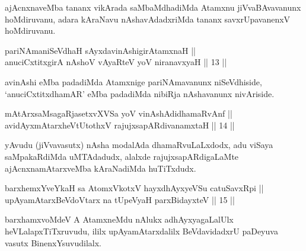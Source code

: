 \begin{artha}
ajAcnxnaveMba tananx vikArada saMbaMdhadiMda Atamxnu jiVvaBAvavanunx hoMdiruvanu, adara kAraNavu nAshavAdadxriMda tananx savxrUpavanenxV hoMdiruvanu.
\end{artha}


\begin{shl}
pariNAmaniSeVdhaH sAyxdavinAshigirA\s \s tamxnaH || \\
anuciCxtitxgirA nAshoV vAyaRteV yoV niranavxyaH \hfill || 13 ||  
\end{shl}	

\begin{artha}
avinAshi eMba padadiMda Atamxnige pariNAmavanunx niSeVdhiside, `anuciCxtitxdhamAR' eMba padadiMda nibiRja nAshavanunx nivAriside.
\end{artha}


\begin{shl}
mAtArxsaMsagaRjasetxvXVSa yoV vinAshAdidhamaRvAnf ||  \\
avidAyxmAtarxheVtUtothxV rajujxsapARdivanamxtaH \hfill || 14 ||  
\end{shl}

\begin{artha}
yAvudu (jiVvavasutx) nAsha modalAda dhamaRvuLaLxdodx, adu viSaya saMpakaRdiMda uMTAdadudx, alalxde rajujxsapARdigaLaMte ajAcnxnamAtarxveMba kAraNadiMda huTiTxdudx.
\end{artha}


\begin{shl}
barxhemxYveYkaH sa AtomxVkotxV hayxdhAyxyeVSu catuSavxRpi || \\
upAyamAtarxBeVdoV\s tarx na tUpeVyaH parxBidayxteV \hfill || 15 ||  
\end{shl}

\begin{artha}
barxhamxvoMdeV A AtamxneMdu nAlukx adhAyxyagaLalUlx heVLalapxTiTxruvudu, ililx upAyamAtarxdalilx BeVdavidadxrU paDeyuva vasutx BinenxYsuvudilalx.
\end{artha}


